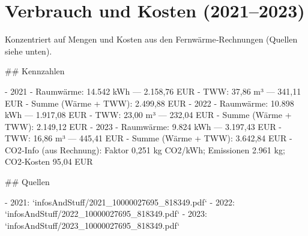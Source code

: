\documentclass[11pt,oneside]{report}
\begin{document}
\chapter{Verbrauch und Kosten (2021--2023)}
\begin{markdown}
Konzentriert auf Mengen und Kosten aus den Fernwärme‑Rechnungen (Quellen siehe unten).

## Kennzahlen

- 2021
  - Raumwärme: 14.542 kWh — 2.158,76 EUR
  - TWW: 37,86 m³ — 341,11 EUR
  - Summe (Wärme + TWW): 2.499,88 EUR
- 2022
  - Raumwärme: 10.898 kWh — 1.917,08 EUR
  - TWW: 23,00 m³ — 232,04 EUR
  - Summe (Wärme + TWW): 2.149,12 EUR
- 2023
  - Raumwärme: 9.824 kWh — 3.197,43 EUR
  - TWW: 16,86 m³ — 445,41 EUR
  - Summe (Wärme + TWW): 3.642,84 EUR
  - CO2‑Info (aus Rechnung): Faktor 0,251 kg CO2/kWh; Emissionen 2.961 kg; CO2‑Kosten 95,04 EUR

## Quellen

- 2021: `infosAndStuff/2021_10000027695_818349.pdf`
- 2022: `infosAndStuff/2022_10000027695_818349.pdf`
- 2023: `infosAndStuff/2023_10000027695_818349.pdf`
\end{markdown}
\end{document}

